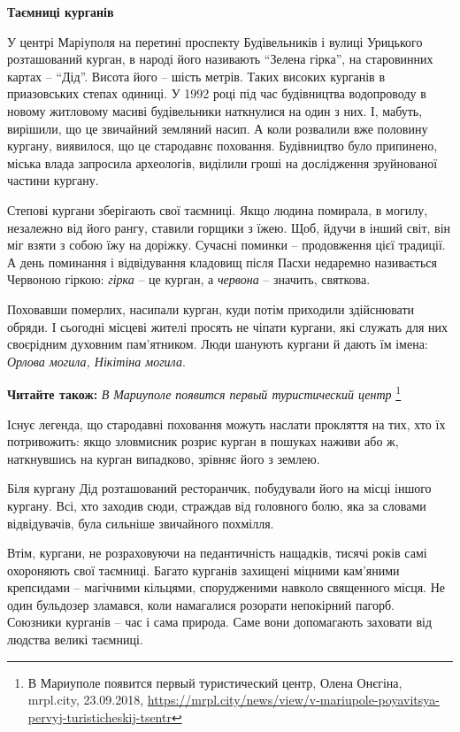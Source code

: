 \begin{center}
\textbf{Таємниці курганів}
\end{center}


У центрі Маріуполя на перетині проспекту Будівельників і вулиці Урицького
розташований курган, в народі його називають \enquote{Зелена гірка}, на
старовинних картах – \enquote{Дід}. Висота його – шість метрів. Таких високих
курганів в приазовських степах одиниці. У 1992 році під час будівництва
водопроводу в новому житловому масиві будівельники наткнулися на один з них. І,
мабуть, вирішили, що це звичайний земляний насип. А коли розвалили вже половину
кургану, виявилося, що це стародавнє поховання. Будівництво було припинено,
міська влада запросила археологів, виділили гроші на дослідження зруйнованої
частини кургану.

Степові кургани зберігають свої таємниці. Якщо людина помирала, в могилу,
незалежно від його рангу, ставили горщики з їжею. Щоб, йдучи в інший світ, він
міг взяти з собою їжу на доріжку. Сучасні поминки – продовження цієї традиції.
А день поминання і відвідування кладовищ після Пасхи недаремно називається
Червоною гіркою: \emph{гірка} – це курган, а \emph{червона} – значить,
святкова.

Поховавши померлих, насипали курган, куди потім приходили здійснювати обряди. І
сьогодні місцеві жителі просять не чіпати кургани, які служать для них
своєрідним духовним пам'ятником. Люди шанують кургани й дають їм імена:
\emph{Орлова могила, Нікітіна могила}.

\textbf{Читайте також:} \emph{В Мариуполе появится первый туристический центр}%
\footnote{В Мариуполе появится первый туристический центр, Олена Онєгіна, mrpl.city, 23.09.2018, \url{https://mrpl.city/news/view/v-mariupole-poyavitsya-pervyj-turisticheskij-tsentr}}

Існує легенда, що стародавні поховання можуть наслати прокляття на тих, хто їх
потривожить: якщо зловмисник розриє курган в пошуках наживи або ж, наткнувшись
на курган випадково, зрівняє його з землею.

Біля кургану Дід розташований ресторанчик, побудували його на місці іншого
кургану. Всі, хто заходив сюди, страждав від головного болю, яка за словами
відвідувачів, була сильніше звичайного похмілля.

Втім, кургани, не розраховуючи на педантичність нащадків, тисячі років самі
охороняють свої таємниці. Багато курганів захищені міцними кам'яними крепсидами
– магічними кільцями, спорудженими навколо священного місця. Не один бульдозер
зламався, коли намагалися розорати непокірний пагорб. Союзники курганів – час і
сама природа. Саме вони допомагають заховати від людства великі таємниці.


